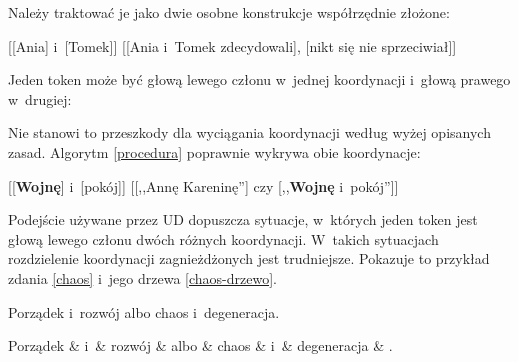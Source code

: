 Należy traktować je jako dwie osobne konstrukcje współrzędnie złożone:

\begin{exe}
\ex \label{zagnieżdżona-1}
{[[Ania] i~[Tomek]]}
\ex \label{zagnieżdżona-2}
{[[Ania i~Tomek zdecydowali], [nikt się nie sprzeciwiał]]}
\end{exe}

Jeden token może być głową lewego członu w~jednej koordynacji i~głową prawego w~drugiej:

\begin{exe}
\ex \label{wojna+pokój}
\end{exe}

Nie stanowi to przeszkody dla wyciągania koordynacji według wyżej opisanych zasad. Algorytm \eqref{procedura} poprawnie wykrywa obie koordynacje:

\begin{exe}
\ex \label{wojna+pokój-1} 
{[[\textbf{Wojnę}] i~[pokój]]}
\ex \label{wojna+pokój-2} 
{[[,,Annę Kareninę''] czy [,,\textbf{Wojnę} i~pokój'']]}
\end{exe}

Podejście używane przez UD dopuszcza sytuacje, w~których jeden token jest głową lewego członu dwóch różnych koordynacji. W~takich sytuacjach rozdzielenie koordynacji zagnieżdżonych jest trudniejsze. Pokazuje to przykład zdania \eqref{chaos} i~jego drzewa \eqref{chaos-drzewo}.

\begin{exe}
\ex \label{chaos}
Porządek i~rozwój albo chaos i~degeneracja.
\ex \label{chaos-drzewo}
\begin{dependency}[baseline=-\the\dimexpr\fontdimen22\textfont2\relax]
\begin{deptext}[column sep=1em]
Porządek \& i~\& rozwój \& albo \& chaos \& i~\& degeneracja \& .  \\ 
\end{deptext}
\end{dependency}
\end{exe}

